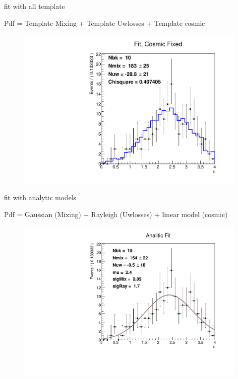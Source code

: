 \documentclass[9pt]{beamer}
\begin{document}
\begin{frame}{fit with all template}

Pdf = Template Mixing + Template Uwlosses + Template cosmic

\begin{figure}[hbtp]
\centering
\includegraphics[width = 0.65 \textwidth]{FitTemplate.pdf}
\end{figure}
\end{frame}

\begin{frame}{fit with analytic models}

Pdf = Gaussian (Mixing) + Rayleigh (Uwlosses) + linear model (cosmic)

\begin{figure}[hbtp]
\centering
\includegraphics[width = 0.70 \textwidth]{TuttoAnalitico.pdf}
\end{figure}
\end{frame}
\end{document}
